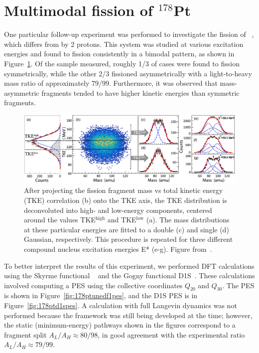 \section{Multimodal fission of $^{178}$Pt}\label{sect:178Ptfrags}

One particular follow-up experiment was performed to investigate the fission of {\Pt}~\cite{Tsekhanovich2019}, which differs from {\Hg} by 2 protons. This system was studied at various excitation energies and found to fission consistently in a bimodal pattern, as shown in Figure~\ref{fig:178ptexptdata}. Of the sample measured, roughly 1/3 of cases were found to fission symmetrically, while the other 2/3 fissioned asymmetrically with a light-to-heavy mass ratio of approximately 79/99. Furthermore, it was observed that mass-asymmetric fragments tended to have higher kinetic energies than symmetric fragments.

\begin{figure}
	\centering
	\includegraphics[width=0.95\linewidth]{TeX_files/178Pt_expt_data}
	\caption{After projecting the fission fragment mass vs total kinetic energy (TKE) correlation (b) onto the TKE axis, the TKE distribution is deconvoluted into high- and low-energy components, centered around the values TKE$^\mathrm{high}$ and TKE$^\mathrm{low}$ (a). The mass distributions at these particular energies are fitted to a double (c) and single (d) Gaussian, respectively. This procedure is repeated for three different compound nucleus excitation energies E* (e-g). Figure from~\cite{Tsekhanovich2019}.}
	\label{fig:178ptexptdata}
\end{figure}

To better interpret the results of this experiment, we performed DFT calculations using the Skyrme functional {\hfb}~\cite{Schunck2015} and the Gogny functional D1S~\cite{Berger1989}. These calculations involved computing a PES using the collective coordinates $Q_{20}$ and $Q_{30}$. The {\hfb} PES is shown in Figure~\ref{fig:178ptunedf1pes}, and the D1S PES is in Figure~\ref{fig:178ptd1spes}. A calculation with full Langevin dynamics was not performed because the framework was still being developed at the time; however, the static (minimum-energy) pathways shown in the figures correspond to a fragment split $A_L/A_H \approx 80/98$, in good agreement with the experimental ratio $A_L/A_H \approx 79/99$.

